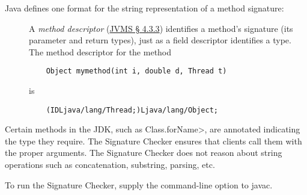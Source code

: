 Java defines one format for the string representation of a method signature:

\begin{description}

\item[]
  A \emph{method descriptor} (\href{https://docs.oracle.com/javase/specs/jvms/se10/html/jvms-4.html#jvms-4.3.3}{JVMS \S
    4.3.3}) identifies a method's signature (its parameter and return
  types), just as a field descriptor identifies a
  type.   The method descriptor for the method
\begin{Verbatim}
    Object mymethod(int i, double d, Thread t)
\end{Verbatim}
\noindent is
\begin{Verbatim}
    (IDLjava/lang/Thread;)Ljava/lang/Object;
\end{Verbatim}

\end{description}



Certain methods in the JDK, such as \<Class.forName>, are annotated
indicating the type they require.  The Signature Checker ensures that
clients call them with the proper arguments.  The Signature Checker does
not reason about string operations such as concatenation, substring,
parsing, etc.

\begin{sloppypar}
To run the Signature Checker, supply the
command-line option to javac.
\end{sloppypar}


